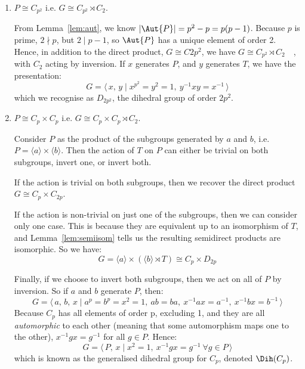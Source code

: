 \begin{enumerate}
    \item \(P \cong C_{p^2}\) i.e. \(G \cong C_{p^2} \rtimes C_2\).

        From Lemma~\ref{lem:aut}, we know \(|\Aut{P}| = p^2 - p = p(p-1)\).
        Because \(p\) is prime, \(2 \nmid p\), but \( 2 \mid p - 1\), so \(\Aut{P}\) has a unique element of order 2.
        Hence, in addition to the direct product, \(G \cong C{2p^2}\), we have \(G \cong C_{p^2} \rtimes C_2 \quad \),
        with \(C_2\) acting by inversion.
        If \(x\) generates \(P\), and \(y\) generates \(T\), we have the presentation:
        \[G = \langle\, x,\,y \mid x^{p^2} = y^2 = 1,\ y^{-1}xy = x^{-1}\,\rangle\]
        which we recognise as \(D_{2p^2}\), the dihedral group of order \(2p^2\).

    \item \(P \cong C_p \times C_p\) i.e. \(G \cong C_p \times C_p \rtimes C_2\).

        Consider \(P\) as the product of the subgroups generated by \(a\) and \(b\), i.e. \(P = \langle a \rangle \times
        \langle b \rangle\).
        Then the action of \(T\) on \(P\) can either be trivial on both subgroups, invert one, or invert both.

        If the action is trivial on both subgroups, then we recover the direct product \(G \cong C_p \times C_{2p}\).

        If the action is non-trivial on just one of the subgroups, then we can consider only one case.
        This is because they are equivalent up to an isomorphism of \(T\), and Lemma~\ref{lem:semiisom} tells us the
        resulting semidirect products are isomorphic.
        So we have:
        \[G = \langle a \rangle \times (\langle b \rangle \rtimes T) \cong C_p \times D_{2p}\]
        
        Finally, if we choose to invert both subgroups, then we act on all of \(P\) by inversion.
        So if \(a\) and \(b\) generate \(P\), then:
        \[G = \langle\, a,\,b,\,x \mid a^p = b^p = x^2 = 1,\ ab = ba,\ x^{-1}ax = a^{-1},\ x^{-1}bx = b^{-1}\,\rangle\]
        Because \(C_p\) has all elements of order p, excluding 1, and they are all \emph{automorphic} to each other (meaning
        that some automorphism maps one to the other), \(x^{-1}gx = g^{-1}\) for all \(g \in P\).
        Hence:
        \[G = \langle\, P,\,x \mid x^2 = 1,\ x^{-1}gx = g^{-1}\ \forall g \in P \,\rangle\]
        which is known as the generalised dihedral group for \(C_p\), denoted \(\Dih(C_p)\).

\end{enumerate}
